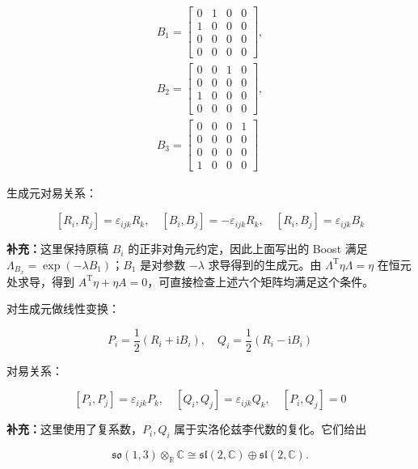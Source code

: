 \begin{gather}
B_1
=\begin{bmatrix}
0 &1 &0 &0 \\
1 &0 &0 &0 \\
0 &0 &0 &0 \\
0 &0 &0 &0
\end{bmatrix},\\
B_2
=\begin{bmatrix}
0 &0 &1 &0 \\
0 &0 &0 &0 \\
1 &0 &0 &0 \\
0 &0 &0 &0
\end{bmatrix},\\
B_3
=\begin{bmatrix}
0 &0 &0 &1 \\
0 &0 &0 &0 \\
0 &0 &0 &0 \\
1 &0 &0 &0
\end{bmatrix}
\end{gather}

生成元对易关系：

\begin{equation}
\left[R_i,R_j \right]=\varepsilon_{ijk}R_k,\quad
\left[B_i,B_j \right]=-\varepsilon_{ijk}R_k,\quad
\left[R_i,B_j \right]=\varepsilon_{ijk}B_k
\end{equation}

\textbf{补充：}这里保持原稿 $B_i$ 的正非对角元约定，因此上面写出的 Boost 满足 $\Lambda_{B_x}=\exp\left(-\lambda B_1\right)$；$B_1$ 是对参数 $-\lambda$ 求导得到的生成元。由 $\Lambda^{\mathrm T}\eta\Lambda=\eta$ 在恒元处求导，得到 $A^{\mathrm T}\eta+\eta A=0$，可直接检查上述六个矩阵均满足这个条件。

对生成元做线性变换：

\begin{equation}
P_i = \frac{1 }{2 } \left(R_i+\mathrm{i}B_i \right),\quad
Q_i = \frac{1 }{2 } \left(R_i-\mathrm{i}B_i \right)
\end{equation}

对易关系：

\begin{equation}
\left[P_i,P_j \right]=\varepsilon_{ijk}P_k,\quad
\left[Q_i,Q_j \right]=\varepsilon_{ijk}Q_k,\quad
\left[P_i,Q_j \right]=0
\end{equation}

\textbf{补充：}这里使用了复系数，$P_i,Q_i$ 属于实洛伦兹李代数的复化。它们给出

\begin{equation}
\mathfrak{so}\left(1,3\right)\otimes_{\mathbb{R}}\mathbb{C}
\cong\mathfrak{sl}\left(2,\mathbb{C}\right)\oplus\mathfrak{sl}\left(2,\mathbb{C}\right).
\end{equation}

